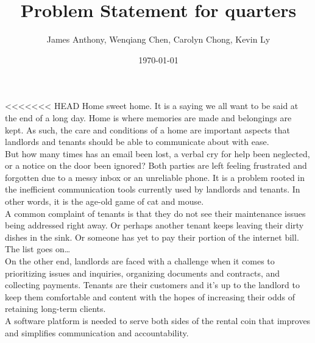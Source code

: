 \documentclass[12pt]{article}
\begin{document}
\title{Problem Statement for quarters} 
\author{James Anthony, Wenqiang Chen, Carolyn Chong, Kevin Ly}
\date{\today}
	
\maketitle

<<<<<<< HEAD
Home sweet home. It is a saying we all want to be said at the end of a long day. Home is where memories are made and belongings are kept. As such, the care and conditions of a home are important aspects that landlords and tenants should be able to communicate about with ease. \\

But how many times has an email been lost, a verbal cry for help been neglected, or a notice on the door been ignored? Both parties are left feeling frustrated and forgotten due to a messy inbox or an unreliable phone. It is a problem rooted in the inefficient communication tools currently used by landlords and tenants. In other words, it is the age-old game of cat and mouse.\\
 
A common complaint of tenants is that they do not see their maintenance issues being addressed right away. Or perhaps another tenant keeps leaving their dirty dishes in the sink. Or someone has yet to pay their portion of the internet bill. The list goes on\ldots \\

On the other end, landlords are faced with a challenge when it comes to prioritizing issues and inquiries, organizing documents and contracts, and collecting payments. Tenants are their customers and it's up to the landlord to keep them comfortable and content with the hopes of increasing their odds of retaining long-term clients.\\

A software platform is needed to serve both sides of the rental coin that improves and simplifies communication and accountability.\\
\end{document}

